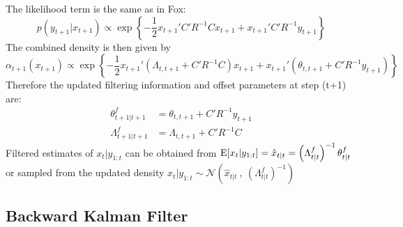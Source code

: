 \documentclass{article} %
\begin{document}
The likelihood term is the same as in Fox:
\[p(y_{t+1}|x_{t+1})\propto\exp\left\{-\frac{1}{2} x_{t+1}'C'R^{-1}Cx_{t+1} + x_{t+1}'C'R^{-1}y_{t+1}\right\}\]
The combined density is then given by
\[\alpha_{t+1}(x_{t+1})\propto\exp\left\{-\frac{1}{2}x_{t+1}'\left(\Lambda_{t,t+1}+C'R^{-1}C\right)x_{t+1} + x_{t+1}'\left(\theta_{t,t+1}+C'R^{-1}y_{t+1}\right)\right\}\]
Therefore the updated filtering information and offset parameters at step (t+1) are:
\begin{align*}
\theta^f_{t+1|t+1} &= \theta_{t,t+1} + C'R^{-1}y_{t+1}\\
\Lambda^f_{t+1|t+1} &= \Lambda_{t,t+1} + C'R^{-1}C %
\end{align*}
Filtered estimates of $x_{t}|y_{1:t}$ can be obtained from $\mbox{E}[x_{t}|y_{1:t}] = \hat{x}_{t|t} = \left(\Lambda^f_{t|t}\right)^{-1}\theta^f_{t|t}$ or sampled from the updated density $x_{t}|y_{1:t}\sim\mathcal{N}\left(\hat{x}_{t|t}~,~\left(\Lambda^f_{t|t}\right)^{-1}\right)$

\subsection{Backward Kalman Filter}
\end{document}
